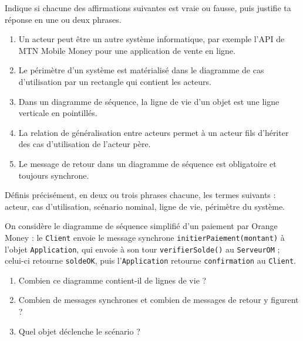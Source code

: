 \documentclass[11pt]{article}
\newcommand{\cle}[1]{{\popxbold\color{popdark}#1}}
\newcounter{popsec}
\newcounter{popsub}
\newcommand{\courssub}[1]{%
  \stepcounter{popsub}%
  \par\vspace{9pt}\noindent{\popxbold\fontsize{11.5}{13}\selectfont\color{popink}{\color{poporange}\thepopsec.\thepopsub}\hspace{6pt}#1}\par\nopagebreak\vspace{4pt}
}
\begin{document}
\begin{exercice}
Indique si chacune des affirmations suivantes est vraie ou fausse, puis justifie ta réponse en une ou deux phrases.
\begin{enumerate}
\item Un acteur peut être un autre système informatique, par exemple l'API de MTN Mobile Money pour une application de vente en ligne.
\item Le périmètre d'un système est matérialisé dans le diagramme de cas d'utilisation par un rectangle qui contient les acteurs.
\item Dans un diagramme de séquence, la ligne de vie d'un objet est une ligne verticale en pointillés.
\item La relation de généralisation entre acteurs permet à un acteur fils d'hériter des cas d'utilisation de l'acteur père.
\item Le message de retour dans un diagramme de séquence est obligatoire et toujours synchrone.
\end{enumerate}
\end{exercice}

\begin{exercice}[Définitions]
Définis précisément, en deux ou trois phrases chacune, les termes suivants : \cle{acteur}, \cle{cas d'utilisation}, \cle{scénario nominal}, \cle{ligne de vie}, \cle{périmètre du système}.
\end{exercice}

\begin{exercice}
On considère le diagramme de séquence simplifié d'un paiement par Orange Money : le \texttt{Client} envoie le message synchrone \texttt{initierPaiement(montant)} à l'objet \texttt{Application}, qui envoie à son tour \texttt{verifierSolde()} au \texttt{ServeurOM} ; celui-ci retourne \texttt{soldeOK}, puis l'\texttt{Application} retourne \texttt{confirmation} au \texttt{Client}.
\begin{enumerate}
\item Combien ce diagramme contient-il de lignes de vie ?
\item Combien de messages synchrones et combien de messages de retour y figurent ?
\item Quel objet déclenche le scénario ?
\end{enumerate}
\end{exercice}

\courssub{Je m'entraîne}
\end{document}
